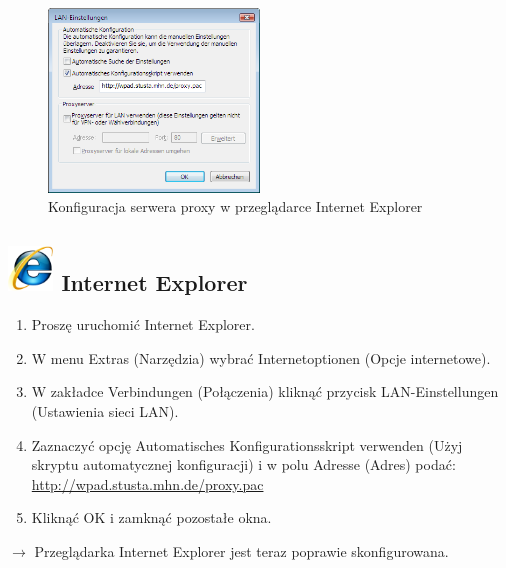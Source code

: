 \documentclass[a4paper,12pt]{scrartcl}
\begin{document}
\begin{figure}
  \begin{center}
    \includegraphics[width=0.5\textwidth,keepaspectratio]{Bilder/Proxy_IE}
  \end{center}
  \caption{Konfiguracja serwera proxy w przeglądarce Internet Explorer}
\end{figure}

\subsection*{\includegraphics[height=1.2cm,keepaspectratio]{Bilder/Internet_Explorer_7_Logo} Internet Explorer}
\begin{enumerate}
    \item Proszę uruchomić Internet Explorer.
    \item W menu Extras (Narzędzia) wybrać Internetoptionen (Opcje internetowe).
    \item W zakładce Verbindungen (Połączenia) kliknąć przycisk LAN-Einstellungen (Ustawienia sieci LAN).
    \item Zaznaczyć opcję  Automatisches Konfigurationsskript verwenden (Użyj skryptu automatycznej konfiguracji) i w polu Adresse (Adres) podać:\\ \url{http://wpad.stusta.mhn.de/proxy.pac}
    \item Kliknąć OK i zamknąć pozostałe okna.
\end{enumerate}
$\rightarrow$ Przeglądarka Internet Explorer jest teraz poprawie skonfigurowana.
\end{document}
